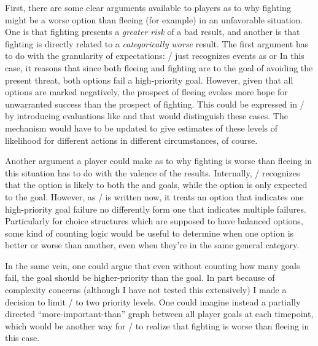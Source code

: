 First, there are some clear arguments available to players as to why fighting might be a worse option than fleeing (for example) in an unfavorable situation.
%
One is that fighting presents a \emph{greater risk} of a bad result, and another is that fighting is directly related to a \emph{categorically worse} result.
%
The first argument has to do with the granularity of expectations: \dunyazad/ just recognizes events as   or 
%
In this case, it reasons that since both fleeing and fighting are  to  the goal of avoiding the present threat, both options fail a high-priority goal.
%
However, given that all options are marked negatively, the prospect of fleeing evokes more hope for unwarranted success than the prospect of fighting.
%
This could be expressed in \dunyazad/ by introducing evaluations like  and  that would distinguish these cases.
%
The  mechanism would have to be updated to give estimates of these levels of likelihood for different actions in different circumstances, of course.


Another argument a player could make as to why fighting is worse than fleeing in this situation has to do with the valence of the results.
%
Internally, \dunyazad/ recognizes that the  option is likely to  both the  and  goals, while the  option is only expected to  the  goal.
%
However, as \dunyazad/ is written now, it treats an option that indicates one high-priority goal failure no differently form one that indicates multiple failures.
%
Particularly for choice structures which are supposed to have balanced options, some kind of counting logic would be useful to determine when one option is better or worse than another, even when they're in the same general category.


In the same vein, one could argue that even without counting how many goals fail, the  goal should be higher-priority than the  goal.
%
In part because of complexity concerns (although I have not tested this extensively) I made a decision to limit \dunyazad/ to two priority levels.
%
One could imagine instead a partially directed ``more-important-than'' graph between all player goals at each timepoint, which would be another way for \dunyazad/ to realize that fighting is worse than fleeing in this case.


